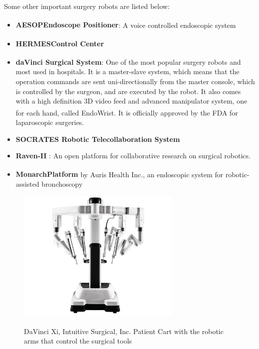 Some other important surgery robots are listed below:
\begin{itemize}
\item \textbf{AESOP\textsuperscript \textregistered Endoscope Positioner}: A voice controlled endoscopic system
\item \textbf{HERMES\textsuperscript \textregistered Control Center}
\item \textbf{daVinci Surgical System\textsuperscript \textregistered}: One of the most popular surgery robots and most used 
in hospitals. It is a master-slave system, which means that the operation commands are sent uni-directionally from the master 
console, which is controlled by the surgeon, and are executed by the robot. It also comes with a high definition 3D video feed 
and advanced manipulator system, one for each hand, called EndoWrist\textsuperscript \textregistered. It is officially approved 
by the FDA for laparoscopic surgeries.
\item \textbf{SOCRATES Robotic Telecollaboration System}
\item \textbf{Raven-II} \cite{Raven2}: An open platform for collaborative research on surgical robotics.
\item \textbf{Monarch\textsuperscript \texttrademark Platform} by Auris Health Inc., an endoscopic system for robotic-assisted 
bronchoscopy
\end{itemize}

\begin{center}
\begin{figure}[!htb]
\centering
\includegraphics[width=0.7\textwidth]{images/intuitive-da-vinci-xi-patient-cart-front-view-1060867-lo-res.jpg}\\
\caption{DaVinci Xi, \textsuperscript {} Intuitive Surgical, Inc. Patient Cart with the robotic arms that control the surgical tools}
\end{figure}
\end{center}

